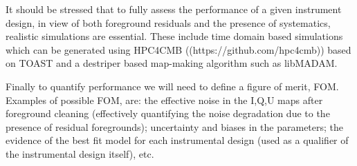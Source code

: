 It should be stressed that to fully assess the performance of a given instrument design, in view of both foreground residuals and the presence of systematics, realistic simulations are essential. These include time domain based simulations which can be generated using HPC4CMB ((https://github.com/hpc4cmb)) based on TOAST 
and a destriper based map-making algorithm such as libMADAM. 


Finally to quantify performance we will need to define a figure of merit, FOM. Examples of possible FOM, are: the effective noise in the I,Q,U maps after foreground cleaning (effectively quantifying the noise degradation due to the presence of residual foregrounds); uncertainty and biases in the parameters; the evidence of the best fit model for each instrumental design (used as a qualifier of the instrumental design itself), etc.


 



%





